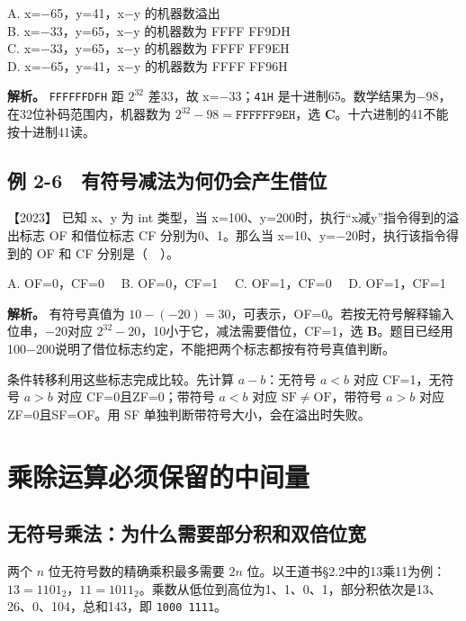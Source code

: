 A. x=−65，y=41，x−y 的机器数溢出\\
B. x=−33，y=65，x−y 的机器数为 FFFF FF9DH\\
C. x=−33，y=65，x−y 的机器数为 FFFF FF9EH\\
D. x=−65，y=41，x−y 的机器数为 FFFF FF96H


\textbf{解析。} \texttt{FFFFFFDFH} 距 \(2^{32}\) 差33，故 x=−33；\texttt{41H} 是十进制65。数学结果为−98，在32位补码范围内，机器数为 \(2^{32}-98=\mathtt{FFFFFF9EH}\)，选 \textbf{C}。十六进制的41不能按十进制41读。

\subsection{例 2-6　有符号减法为何仍会产生借位}\label{co-ex2-6}

\noindent{}【2023】 已知 x、y 为 int 类型，当 x=100、y=200时，执行``x减y''指令得到的溢出标志 OF 和借位标志 CF 分别为0、1。那么当 x=10、y=−20时，执行该指令得到的 OF 和 CF 分别是（　）。

A. OF=0，CF=0　 B. OF=0，CF=1　 C. OF=1，CF=0　 D. OF=1，CF=1


\textbf{解析。} 有符号真值为 \(10-(-20)=30\)，可表示，OF=0。若按无符号解释输入位串，−20对应 \(2^{32}-20\)，10小于它，减法需要借位，CF=1，选 \textbf{B}。题目已经用100−200说明了借位标志约定，不能把两个标志都按有符号真值判断。

条件转移利用这些标志完成比较。先计算 \(a-b\)：无符号 \(a<b\) 对应 CF=1，无符号 \(a>b\) 对应 CF=0且ZF=0；带符号 \(a<b\) 对应 \(\mathrm{SF}\ne\mathrm{OF}\)，带符号 \(a>b\) 对应ZF=0且SF=OF。用 SF 单独判断带符号大小，会在溢出时失败。

\section{乘除运算必须保留的中间量}\label{co-02-06}

\subsection{无符号乘法：为什么需要部分积和双倍位宽}\label{co-c02-h150}

两个 \(n\) 位无符号数的精确乘积最多需要 \(2n\) 位。以王道书§2.2中的13乘11为例：\(13=1101_2\)，\(11=1011_2\)。乘数从低位到高位为1、1、0、1，部分积依次是13、26、0、104，总和143，即 \texttt{1000\ 1111}。

